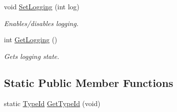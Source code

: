 \begin{DoxyCompactItemize}
void \hyperlink{classns3_1_1WaveBsmStats_accda0ce739bf39805957b877802c806c}{Set\+Logging} (int log)
\begin{DoxyCompactList}\small\item\em Enables/disables logging. \end{DoxyCompactList}\item 
int \hyperlink{classns3_1_1WaveBsmStats_a75b49ab35f15692433ef3f86cbf1066d}{Get\+Logging} ()
\begin{DoxyCompactList}\small\item\em Gets logging state. \end{DoxyCompactList}\end{DoxyCompactItemize}
\subsection*{Static Public Member Functions}
\begin{DoxyCompactItemize}
\item 
static \hyperlink{classns3_1_1TypeId}{Type\+Id} \hyperlink{classns3_1_1WaveBsmStats_a4867c62cbde674ff16c4d32847309e16}{Get\+Type\+Id} (void)
\end{DoxyCompactItemize}

